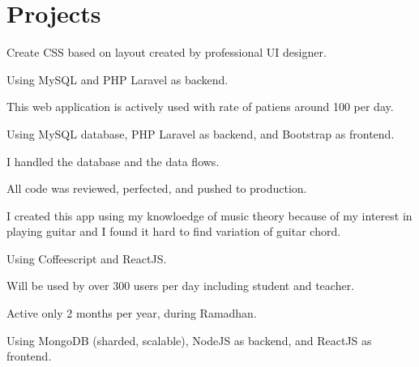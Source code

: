 \documentclass[letterpaper]{deedy-resume} %
\begin{document}
\begin{minipage}[t]{0.66\textwidth} %


\section{Projects}

\vspace{\topsep} %
\begin{tightitemize}
\item Create CSS based on layout created by professional UI designer.
\item Using MySQL and PHP Laravel as backend.
\end{tightitemize}
\sectionspace

\begin{tightitemize}
\item This web application is actively used with rate of patiens around 100 per day.
\item Using MySQL database, PHP Laravel as backend, and Bootstrap as frontend.
\item I handled the database and the data flows.
\item All code was reviewed, perfected, and pushed to production.
\end{tightitemize}
\sectionspace

\begin{tightitemize}
\item I created this app using my knowloedge of music theory because of my interest in playing guitar and I found it hard to find variation of guitar chord.
\item Using Coffeescript and ReactJS.
\end{tightitemize}
\sectionspace

\begin{tightitemize}
\item Will be used by over 300 users per day including student and teacher.
\item Active only 2 months per year, during Ramadhan.
\item Using MongoDB (sharded, scalable), NodeJS as backend, and ReactJS as frontend.
\end{tightitemize}
\sectionspace


\end{minipage}
\end{document}
